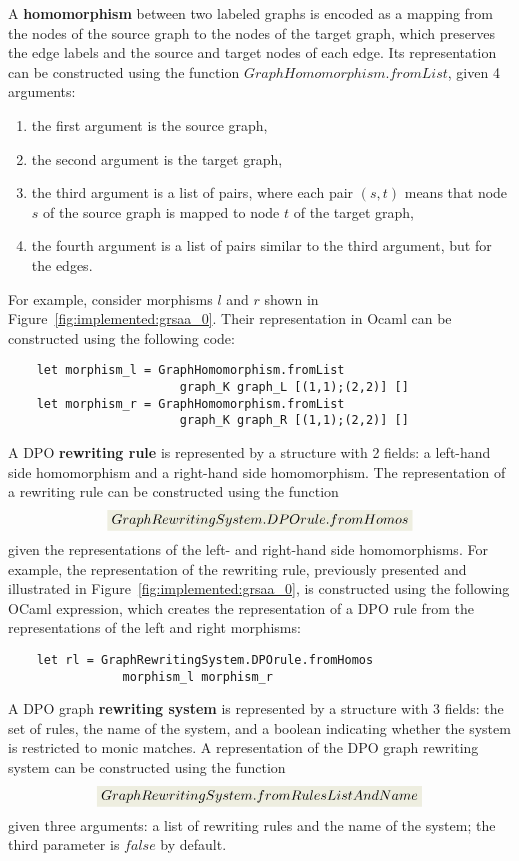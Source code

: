 A \textbf{homomorphism} between two labeled graphs is encoded as a mapping from the nodes of the source graph to the nodes of the target graph, which preserves the edge labels and the source and target nodes of each edge. Its representation can be constructed using the function
\colorbox{Ivory2}{$GraphHomomorphism.fromList$}, given 4 arguments:
    \begin{enumerate}
        \item the first argument is the source graph,
        \item the second argument is the target graph,
        \item the third argument is a list of pairs, where each pair $(s,t)$ means that node $s$ of the source graph is mapped to node $t$ of the target graph,
        \item the fourth argument is a list of pairs similar to the third argument, but for the edges.
    \end{enumerate}
For example, consider morphisms $l$ and $r$ shown in Figure~\ref{fig:implemented:grsaa_0}. Their representation in Ocaml can be constructed using the following code:
\begin{verbatim}
    let morphism_l = GraphHomomorphism.fromList 
                        graph_K graph_L [(1,1);(2,2)] []
    let morphism_r = GraphHomomorphism.fromList
                        graph_K graph_R [(1,1);(2,2)] []
\end{verbatim}

A DPO \textbf{rewriting rule} is represented by a structure with 2 fields: a left-hand side homomorphism and a right-hand side homomorphism. The representation of a rewriting rule can be constructed using the function
 $$\colorbox{Ivory2}{$GraphRewritingSystem.DPOrule.fromHomos$}$$
given the representations of the left- and right-hand side homomorphisms.
For example, the representation of the rewriting rule, previously presented and illustrated in Figure~\ref{fig:implemented:grsaa_0}, is constructed using the following OCaml expression, which creates the representation of a DPO rule from the representations of the left and right morphisms: 
\begin{verbatim}
    let rl = GraphRewritingSystem.DPOrule.fromHomos 
                morphism_l morphism_r
\end{verbatim}

A DPO graph \textbf{rewriting system} is represented by a structure with 3 fields: the set of rules, the name of the system, and a boolean indicating whether the system is restricted to monic matches. A representation of the DPO graph rewriting system
can be constructed using the function 
$$\colorbox{Ivory2}{$GraphRewritingSystem.fromRulesListAndName$}$$ given three arguments: a list of rewriting rules and the name of the system; the third parameter is \colorbox{Ivory2}{$false$} by default.

